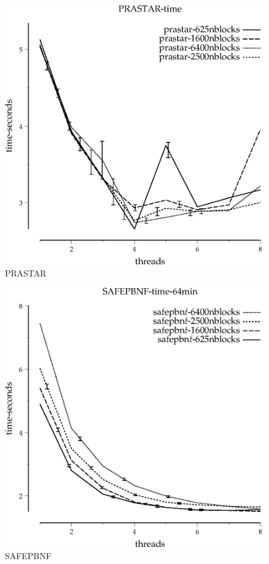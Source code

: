 \documentclass{article}
\begin{document}
\begin{figure}
\begin{center}
\includegraphics{PRASTAR-time}
\end{center}
\caption{PRASTAR}
\end{figure}

\begin{figure}
\begin{center}
\includegraphics{SAFEPBNF-time-64min}
\end{center}
\caption{SAFEPBNF}
\end{figure}
\end{document}
